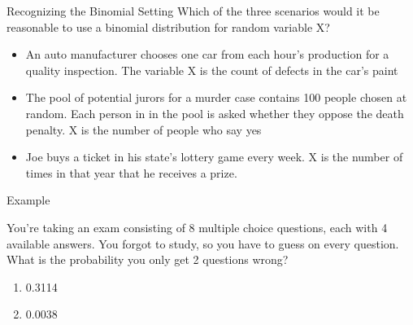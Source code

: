 \documentclass{beamer}
\begin{document}
\begin{frame}{Recognizing the Binomial Setting}
	Which of the three scenarios would it be reasonable to use a binomial distribution for random variable X?
	\begin{itemize}
		\item An auto manufacturer chooses one car from each hour's production for a quality inspection. The variable X is the count of defects in the car's paint
		\item The pool of potential jurors for a murder case contains 100 people chosen at random. Each person in in the pool is asked whether they oppose the death penalty. X is the number of people who say yes
		\item Joe buys a ticket in his state's lottery game every week. X is the number of times in that year that he receives a prize.
	\end{itemize}
\end{frame}

\begin{frame}{Example}
	
	You're taking an exam consisting of 8 multiple choice questions, each with 4 available answers. You forgot to study, so you have to guess on every question. What is the probability you only get 2 questions wrong?
	
	\begin{enumerate}[label=(\alph*)]
		\item 0.3114
		\item 0.0038
	\end{enumerate}
	
\end{frame}


% 
\end{document}
